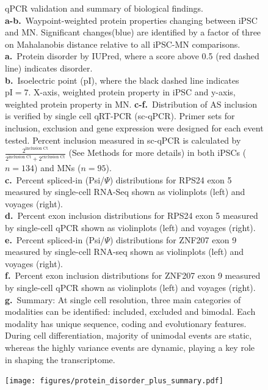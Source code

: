 \clearpage
\thispagestyle{facingcaption}
\begin{figure}[h]
\captionsetup{labelformat=prev-page}
\caption[qPCR validation and summary of biological findings.]{qPCR validation and summary of biological findings.\\
\textbf{a-b.}~Waypoint-weighted protein properties changing between iPSC and MN. Significant changes(blue) are identified by a factor of three on Mahalanobis distance relative to all iPSC-MN comparisons.\\
\textbf{a.}~Protein disorder by IUPred, where a score above 0.5 (red dashed line) indicates disorder.\\
\textbf{b.}~Isoelectric point (pI), where the black dashed line indicates $\text{pI}=7$. X-axis, weighted protein property in iPSC and y-axis, weighted protein property in MN.
\textbf{c-f.}~Distribution of AS inclusion is verified by single cell qRT-PCR (sc-qPCR). Primer sets for inclusion, exclusion and gene expression were designed for each event tested. Percent inclusion measured in sc-qPCR is calculated by $\frac{2^{\text{inclusion Ct}}}{2^{\text{inclusion Ct}} + 2^{\text{exclusion Ct}}}$ (See Methods for more details) in both iPSCs ($n =134$) and MNs ($n = 95$). \\
\textbf{c.}~Percent spliced-in (Psi/$\Psi$) distributions for RPS24 exon 5 measured by single-cell RNA-Seq shown as violinplots (left) and voyages (right).\\
\textbf{d.}~Percent exon inclusion distributions for RPS24 exon 5 measured by single-cell qPCR shown as violinplots (left) and voyages (right).\\
\textbf{e.}~Percent spliced-in (Psi/$\Psi$) distributions for ZNF207 exon 9 measured by single-cell RNA-seq shown as violinplots (left) and voyages (right).\\
\textbf{f.}~Percent exon inclusion distributions for ZNF207 exon 9 measured by single-cell qPCR shown as violinplots (left) and voyages (right).\\
\textbf{g.}~Summary: At single cell resolution, three main categories of modalities can be identified: included, excluded and bimodal. Each modality has unique sequence, coding and evolutionary features. During cell differentiation, majority of unimodal events are static, whereas the highly variance events are dynamic, playing a key role in shaping the transcriptome.
}
\label{fig:protein_disorder_plus_summary}
\end{figure}
\clearpage
\begin{figure}[h]
\ContinuedFloat
\captionsetup{labelformat=empty}
\centering
\texttt{[image: figures/protein\_disorder\_plus\_summary.pdf]}
\end{figure}
\addtocounter{figure}{1}
\clearpage




